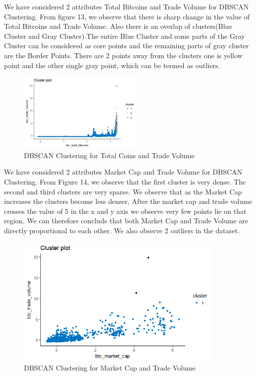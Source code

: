 \documentclass{article}
\begin{document}
We have considered 2 attributes Total Bitcoins and Trade Volume for DBSCAN Clustering. From figure 13, we observe that there is sharp change in the value of Total Bitcoins and Trade Volume. Also there is an overlap of clusters(Blue Cluster and Gray Cluster).The entire Blue Cluster and some parts of the Gray Cluster can be considered as core points and the remaining parts of gray cluster are the Border Points. There are 2 points away from the clusters one is yellow point and the other single gray point, which can be termed as outliers. \newline

\begin{figure}[h]
    \centering
    \includegraphics[width=6cm]{totbitcoinstradevolFig7.png}
    \caption{DBSCAN Clustering for Total Coins and Trade Volume }
    \label{fig:my_label}
\end{figure}

We have considered 2 attributes Market Cap and Trade Volume for DBSCAN Clustering. From Figure 14, we observe that the first cluster is very dense. The second and third clusters are very sparse. We observe that as the Market Cap increases the clusters become less denser, After the market cap and trade volume crosses the value of 5 in the x and y axis we observe very few points lie on that region. We can therefore conclude that both Market Cap and Trade Volume are directly proportional to each other. We also observe 2 outliers in the dataset.



\begin{figure}[h]
    \centering
    \includegraphics[width=10cm]{dbmarcapvolFig8.png}
    \caption{DBSCAN Clustering for Market Cap and Trade Volume }
    \label{fig:my_label}
\end{figure}
\end{document}
